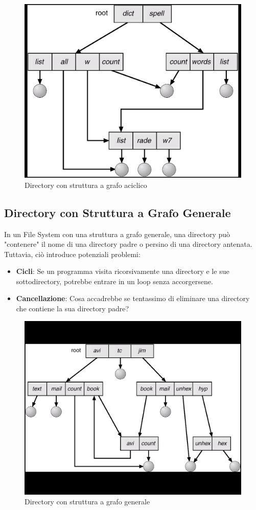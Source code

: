 \begin{figure}[h] \centering \includegraphics[width=0.50\linewidth]{images/dir_graphLevel.png} \caption{Directory con struttura a grafo aciclico} \end{figure}

\subsection{Directory con Struttura a Grafo Generale}
In un File System con una struttura a grafo generale, una directory può "contenere" il nome di una directory padre o persino di una directory antenata. Tuttavia, ciò introduce potenziali problemi:
\begin{itemize}
    \item \textbf{Cicli}: Se un programma visita ricorsivamente una directory e le sue sottodirectory, potrebbe entrare in un loop senza accorgersene.
    \item \textbf{Cancellazione}: Cosa accadrebbe se tentassimo di eliminare una directory che contiene la sua directory padre?
\end{itemize}

\begin{figure}[h] \centering \includegraphics[width=0.50\linewidth]{images/dir_graphGeneralLevel.png} \caption{Directory con struttura a grafo generale} \end{figure}

